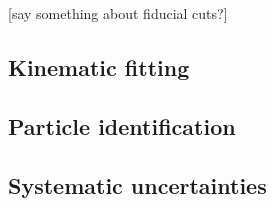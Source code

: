 [say something about fiducial cuts?]

\subsection{Kinematic fitting \label{sec:perffitting}}



\subsection{Particle identification \label{sec:perfpid}}

\subsection{Systematic uncertainties \label{sec:systematics}}
